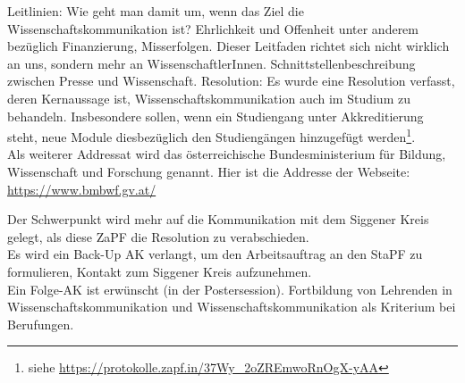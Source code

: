 \begin{outline}
        \1 Leitlinien: Wie geht man damit um, wenn das Ziel die Wissenschaftskommunikation ist?
          \2 Ehrlichkeit und Offenheit unter anderem bezüglich Finanzierung, Misserfolgen.
          \2 Dieser Leitfaden richtet sich nicht wirklich an uns, sondern mehr an WissenschaftlerInnen.
          \2 Schnittstellenbeschreibung zwischen Presse und Wissenschaft.
        \1 Resolution:
        Es wurde eine Resolution verfasst, deren Kernaussage ist, Wissenschaftskommunikation auch im Studium zu behandeln. Insbesondere sollen, wenn ein Studiengang unter Akkreditierung steht, neue Module diesbezüglich den Studiengängen hinzugefügt werden\footnote{siehe \url{https://protokolle.zapf.in/37Wy_2oZREmwoRnOgX-yAA}}. \\
        Als weiterer Addressat wird das österreichische Bundesministerium für Bildung, Wissenschaft und Forschung genannt. Hier ist die Addresse der Webseite: \url{https://www.bmbwf.gv.at/}
      \end{outline}

    Der Schwerpunkt wird mehr auf die Kommunikation mit dem Siggener Kreis gelegt, als diese ZaPF die Resolution zu verabschieden. \\

    Es wird ein Back-Up AK verlangt, um den Arbeitsauftrag an den StaPF zu formulieren, Kontakt zum Siggener Kreis aufzunehmen. \\

    Ein Folge-AK ist erwünscht (in der Postersession). Fortbildung von Lehrenden in Wissenschaftskommunikation und Wissenschaftskommunikation als Kriterium bei Berufungen.
